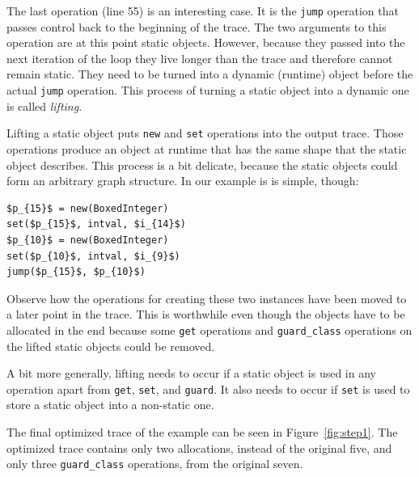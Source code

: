 \documentclass[preprint]{sigplanconf}
\begin{document}
The last operation (line 55) is an interesting case. It is the \lstinline{jump}
operation that passes control back to the beginning of the trace. The two
arguments to this operation are at this point static objects. However, because
they passed into the next iteration of the loop they live longer than the trace
and therefore cannot remain static. They need to be turned into a dynamic
(runtime) object before the actual \lstinline{jump} operation. This process of
turning a static object into a dynamic one is called \emph{lifting}.

Lifting a static object puts \lstinline{new} and \lstinline{set} operations into
the output trace. Those operations produce an object at runtime that has the
same shape that the static object describes. This process is a bit delicate,
because the static objects could form an arbitrary graph structure. In our
example is is simple, though:

\begin{lstlisting}[mathescape,xleftmargin=20pt]
$p_{15}$ = new(BoxedInteger)
set($p_{15}$, intval, $i_{14}$)
$p_{10}$ = new(BoxedInteger)
set($p_{10}$, intval, $i_{9}$)
jump($p_{15}$, $p_{10}$)
\end{lstlisting}


Observe how the operations for creating these two instances have been moved to a
later point in the trace. This is worthwhile even though the objects have to be
allocated in the end because some \lstinline{get} operations and
\lstinline{guard_class} operations on the lifted static objects could be
removed.

A bit more generally, lifting needs to occur if a static object is used in any
operation apart from \lstinline{get}, \lstinline{set}, and \lstinline{guard}.
It also needs to occur if \lstinline{set} is used to store a static object into
a non-static one.

The final optimized trace of the example can be seen in Figure~\ref{fig:step1}.
The optimized trace contains only two allocations, instead of the original five,
and only three \lstinline{guard_class} operations, from the original seven.
\end{document}
